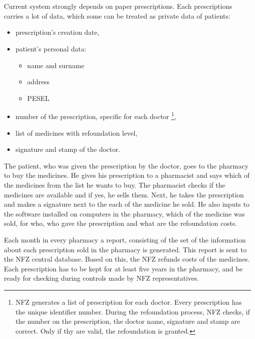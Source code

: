 \chapter{ }

Current system strongly depends on paper prescriptions. Each prescriptions carries a lot of data, which some can be treated as private data of patients:

\begin{itemize}
  \item prescription’s creation date,
  \item patient’s personal data:
  \begin{itemize}
	  \item name and surname
	  \item address
	  \item PESEL
  \end{itemize}
  \item number of the prescription, specific for each doctor \footnote{NFZ generates a list of prescription for each doctor. Every prescription has the unique identifier number. During the refoundation process, NFZ checks, if the number on the prescription, the doctor name, signature and stamp are correct. Only if thy are valid, the refoundation is granted.  },
  \item list of medicines with refoundation level,
  \item signature and stamp of the doctor. 
\end{itemize}

The patient, who was given the prescription by the doctor, goes to the pharmacy to buy the medicines. He gives his prescription to a pharmacist and says which of the medicines from the list he wants to buy. The pharmacist checks if the medicines are available and if yes, he sells them. Next, he takes the prescription and makes a signature next to the each of the medicine he sold. He also inputs to the software installed on computers in the pharmacy, which of the medicine was sold, for who, who gave the prescription and what are the refoundation costs.

Each month in every pharmacy a report, consisting of  the set of the information about each prescription sold in the pharmacy is generated. This report is sent to the NFZ central database. Based on this, the NFZ refunds costs of the medicines. Each prescription has to be kept for at least five years in the pharmacy, and be ready for checking during controls made by NFZ representatives. 

